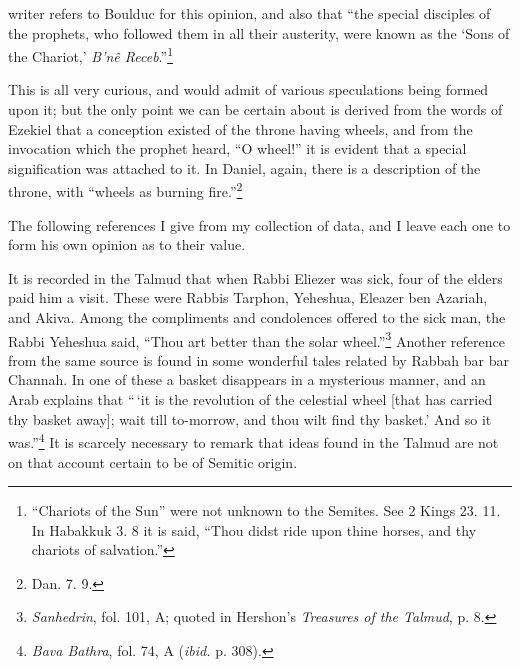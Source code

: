 \documentclass[a4paper, 11pt, oneside, polutonikogreek, english]{article}
\begin{document}
writer refers to Boulduc for this opinion, and also that ``the special disciples of the prophets, who followed them in all their austerity, were known as the `Sons of the Chariot,' \emph{B'nê Receb}.''\footnote{``Chariots of the Sun'' were not unknown to the Semites. See 2 Kings 23. 11. In Habakkuk 3. 8 it is said, ``Thou didst ride upon thine horses, and thy chariots of salvation.''}

This is all very curious, and would admit of various speculations being formed upon it; but the only point we can be certain about is derived from the words of Ezekiel that a conception existed of the throne having wheels, and from the invocation which the prophet heard, ``O wheel!'' it is evident that a special signification was attached to it. In Daniel, again, there is a description of the throne, with ``wheels as burning fire.''\footnote{Dan. 7. 9.}

The following references I give from my collection of data, and I leave each one to form his own opinion as to their value.

It is recorded in the Talmud that when Rabbi Eliezer was sick, four of the elders paid him a visit. These were Rabbis Tarphon, Yeheshua, Eleazer ben Azariah, and Akiva. Among the compliments and condolences offered to the sick man, the Rabbi Yeheshua said, ``Thou art better than the solar wheel.''\footnote{\emph{Sanhedrin}, fol. 101, A; quoted in Hershon's \emph{Treasures of the Talmud}, p. 8.} Another reference from the same source is found in some wonderful tales related by Rabbah bar bar Channah. In one of these a basket disappears in a mysterious manner, and an Arab explains that ``\,`it is the revolution of the celestial wheel [that has carried thy basket away]; wait till to-morrow, and thou wilt find thy basket.' And so it was.''\footnote{\emph{Bava Bathra}, fol. 74, A (\emph{ibid.} p. 308).} It is scarcely necessary to remark that ideas found in the Talmud are not on that account certain to be of Semitic origin.
\end{document}
